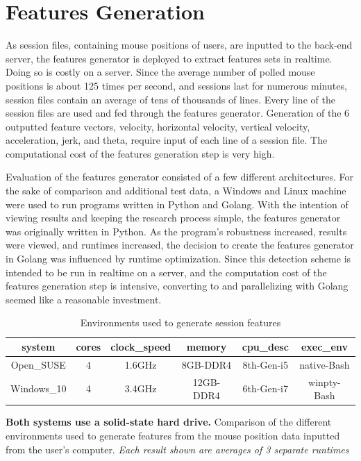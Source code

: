 
\section{Features Generation}\label{sec:evaluation-features-generation}
As session files, containing mouse positions of users, are inputted to the back-end server, the features generator is deployed to extract features sets in realtime. Doing so is costly on a server. Since the average number of polled mouse positions is about 125 times per second, and sessions last for numerous minutes, session files contain an average of tens of thousands of lines. Every line of the session files are used and fed through the features generator. Generation of the 6 outputted feature vectors, velocity, horizontal velocity, vertical velocity, acceleration, jerk, and theta, require input of each line of a session file. The computational cost of the features generation step is very high.

Evaluation of the features generator consisted of a few different architectures. For the sake of comparison and additional test data, a Windows and Linux machine were used to run programs written in Python and Golang. With the intention of viewing results and keeping the research process simple, the features generator was originally written in Python. As the program's robustness increased, results were viewed, and runtimes increased, the decision to create the features generator in Golang was influenced by runtime optimization. Since this detection scheme is intended to be run in realtime on a server, and the computation cost of the features generation step is intensive, converting to and parallelizing with Golang seemed like a reasonable investment.

\begin{table}[h!]
    \centering
    \begin{tabular}{ |c|c|c|c|c|c| }
        \hline
        \textbf{system} & \textbf{cores} & \textbf{clock{\_}speed} & \textbf{memory} & \textbf{cpu{\_}desc} & \textbf{exec{\_}env} \\
        \hline
        Open{\_}SUSE & 4 & 1.6GHz & 8GB-DDR4 & 8th-Gen-i5 & native-Bash \\
        Windows{\_}10 & 4 & 3.4GHz & 12GB-DDR4 & 6th-Gen-i7 & winpty-Bash \\
        \hline
    \end{tabular}
    \caption{Environments used to generate session features}
    {\small \textbf{Both systems use a solid-state hard drive.} Comparison of the different environments used to generate features from the mouse position data inputted from the user's computer. \textit{Each result shown are averages of 3 separate runtimes}}
\end{table}

